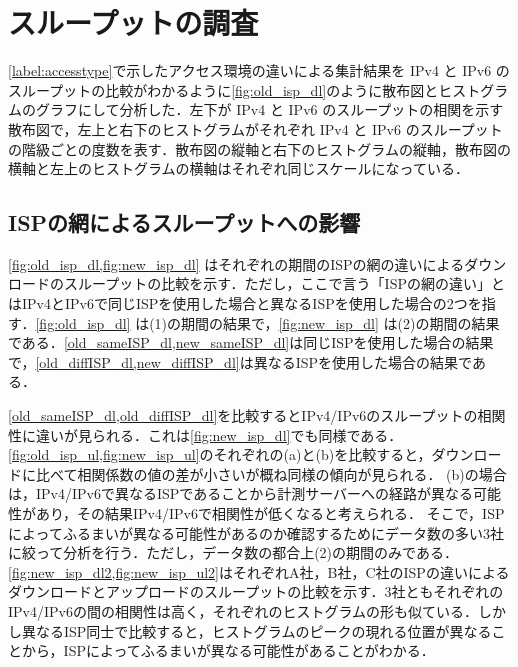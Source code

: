 \section{スループットの調査}
\label{sec:throughput}
\cref{label:accesstype}で示したアクセス環境の違いによる集計結果を IPv4 と IPv6 のスループットの比較がわかるように\cref{fig:old_isp_dl}のように散布図とヒストグラムのグラフにして分析した．左下が IPv4 と IPv6 のスループットの相関を示す散布図で，左上と右下のヒストグラムがそれぞれ IPv4 と IPv6 のスループットの階級ごとの度数を表す．散布図の縦軸と右下のヒストグラムの縦軸，散布図の横軸と左上のヒストグラムの横軸はそれぞれ同じスケールになっている．

\subsection{ISPの網によるスループットへの影響}
\label{subsec:isp_dl}
\cref{fig:old_isp_dl,fig:new_isp_dl} はそれぞれの期間のISPの網の違いによるダウンロードのスループットの比較を示す．ただし，ここで言う「ISPの網の違い」とはIPv4とIPv6で同じISPを使用した場合と異なるISPを使用した場合の2つを指す．\cref{fig:old_isp_dl} は(1)の期間の結果で，\cref{fig:new_isp_dl} は(2)の期間の結果である．\cref{old_sameISP_dl,new_sameISP_dl}は同じISPを使用した場合の結果で，\cref{old_diffISP_dl,new_diffISP_dl}は異なるISPを使用した場合の結果である．

\cref{old_sameISP_dl,old_diffISP_dl}を比較するとIPv4/IPv6のスループットの相関性に違いが見られる．これは\cref{fig:new_isp_dl}でも同様である．\cref{fig:old_isp_ul,fig:new_isp_ul}のそれぞれの(a)と(b)を比較すると，ダウンロードに比べて相関係数の値の差が小さいが概ね同様の傾向が見られる．
(b)の場合は，IPv4/IPv6で異なるISPであることから計測サーバーへの経路が異なる可能性があり，その結果IPv4/IPv6で相関性が低くなると考えられる．
そこで，ISPによってふるまいが異なる可能性があるのか確認するためにデータ数の多い3社に絞って分析を行う．ただし，データ数の都合上(2)の期間のみである．\cref{fig:new_isp_dl2,fig:new_isp_ul2}はそれぞれA社，B社，C社のISPの違いによるダウンロードとアップロードのスループットの比較を示す．3社ともそれぞれのIPv4/IPv6の間の相関性は高く，それぞれのヒストグラムの形も似ている．しかし異なるISP同士で比較すると，ヒストグラムのピークの現れる位置が異なることから，ISPによってふるまいが異なる可能性があることがわかる．

